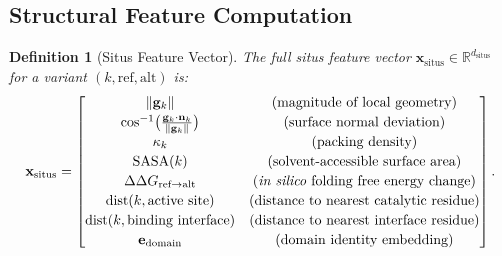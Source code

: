 \documentclass[11pt,a4paper]{article}
\newtheorem{definition}[theorem]{Definition}
\theoremstyle{definition}
\newcommand{\R}{\mathbb{R}}
\begin{document}
\subsection{Structural Feature Computation}
\begin{definition}[Situs Feature Vector]
The full situs feature vector $\mathbf{x}_{\text{situs}} \in \R^{d_{\text{situs}}}$ for a variant $(k, \text{ref}, \text{alt})$ is:
\begin{equation}
    \mathbf{x}_{\text{situs}} = \begin{bmatrix}
        \|\mathbf{g}_k\| & \text{(magnitude of local geometry)} \\[2pt]
        \cos^{-1}\!\big(\frac{\mathbf{g}_k \cdot \mathbf{n}_k}{\|\mathbf{g}_k\|}\big) & \text{(surface normal deviation)} \\[2pt]
        \kappa_k & \text{(packing density)} \\[2pt]
        \text{SASA}(k) & \text{(solvent-accessible surface area)} \\[2pt]
        \Delta\Delta G_{\text{ref}\to\text{alt}} & \text{(\emph{in silico} folding free energy change)} \\[2pt]
        \text{dist}(k, \text{active site}) & \text{(distance to nearest catalytic residue)} \\[2pt]
        \text{dist}(k, \text{binding interface}) & \text{(distance to nearest interface residue)} \\[2pt]
        \mathbf{e}_{\text{domain}} & \text{(domain identity embedding)}
    \end{bmatrix}.
\end{equation}
\end{definition}
\end{document}
